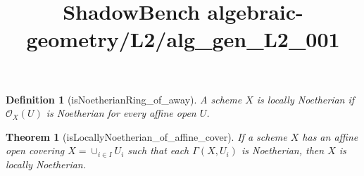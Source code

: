 \documentclass{article}
\title{ShadowBench algebraic-geometry/L2/alg\_gen\_L2\_001}
\newtheorem{theorem}{Theorem}
\newtheorem{definition}{Definition}
\begin{document}
\maketitle

\begin{definition}[isNoetherianRing_of_away]
A scheme $X$ is locally Noetherian if $\mathcal{O}_X(U)$ is Noetherian for every affine open $U$.
\end{definition}

\begin{theorem}[isLocallyNoetherian_of_affine_cover] 
If a scheme $X$ has an affine open covering $X = \cup_{i \in I} U_i$ such that each $\Gamma(X,U_i)$ is Noetherian, then $X$ is locally Noetherian.
\end{theorem}
\end{document}
